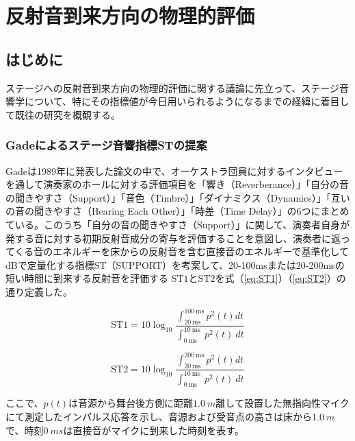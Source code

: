 \documentclass[11pt,a4j]{jreport}
\begin{document}
\chapter{反射音到来方向の物理的評価}


\section{はじめに}
ステージへの反射音到来方向の物理的評価に関する議論に先立って、ステージ音響学について、特にその指標値が今日用いられるようになるまでの経緯に着目して既往の研究を概観する。

\subsection*{Gadeによるステージ音響指標STの提案}
Gadeは1989年に発表した論文\cite{Gade1989I}の中で、オーケストラ団員に対するインタビューを通して演奏家のホールに対する評価項目を「響き（Reverberance）」「自分の音の聞きやすさ（Support）」「音色（Timbre）」「ダイナミクス（Dynamics）」「互いの音の聞きやすさ（Hearing Each Other）」「時差（Time Delay）」の6つにまとめている。このうち「自分の音の聞きやすさ（Support）」に関して、演奏者自身が発する音に対する初期反射音成分の寄与を評価することを意図し、演奏者に返ってくる音のエネルギーを床からの反射音を含む直接音のエネルギーで基準化してdBで定量化する指標ST（SUPPORT）を考案して、20-100msまたは20-200msの短い時間に到来する反射音を評価する $\mathrm{ST1}$と$\mathrm{ST2}$を式（\ref{eq:ST1}）（\ref{eq:ST2}）の通り定義した。

\begin{equation}
  \label{eq:ST1}
  \mathrm{ST1}= 10 \log_{10}
  \frac{\int_{20 \: \mathrm{ms}}^{100 \: \mathrm{ms}} p^2(t) dt}
  {\int_{0 \: \mathrm{ms}}^{10 \: \mathrm{ms}} \: p^2(t) \: dt}
\end{equation}

\begin{equation}
  \label{eq:ST2}
  \mathrm{ST2}= 10 \log_{10}
  \frac{\int_{20 \: \mathrm{ms}}^{200 \: \mathrm{ms}} p^2(t) dt}
  {\int_{0 \: \mathrm{ms}}^{10 \: \mathrm{ms}} \: p^2(t) \: dt}
\end{equation}

\vspace{1\baselineskip}

ここで、$p(t)$は音源から舞台後方側に距離$\SI{1.0}{m}$離して設置した無指向性マイクにて測定したインパルス応答を示し、音源および受音点の高さは床から$\SI{1.0}{m}$で、時刻$\SI{0}{ms}$は直接音がマイクに到来した時刻を表す。
  
\end{document}
